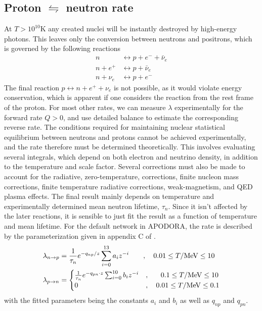\subsection[Proton to neutron rate]{Proton $\leftrightharpoons$ neutron rate}
At $T>10^{10}$K any created nuclei will be instantly destroyed by high-energy photons. This leaves only the conversion between neutrons and positrons, which is governed by the following reactions
\begin{align}
    n &\leftrightarrow p+e^-+\bar{\nu}_e\label{eq:np1}\\
    n+e^+ &\leftrightarrow p+\bar{\nu}_e\label{eq:np2}\\
    n+\nu_e &\leftrightarrow p+e^-
    \label{eq:np3}
\end{align}
The final reaction $p\leftrightarrow n+e^++\nu_e$ is not possible, as it would violate energy conservation, which is apparent if one considers the reaction from the rest frame of the proton. For most other rates, we can measure $\lambda$ experimentally for the forward rate $Q>0$, and use detailed balance to estimate the corresponding reverse rate. The conditions required for maintaining nuclear statistical equilibrium between neutrons and protons cannot be achieved experimentally, and the rate therefore must be determined theoretically. This involves evaluating several integrals, which depend on both electron and neutrino density, in addition to the temperature and scale factor. Several corrections must also be made to account for the radiative, zero-temperature, corrections, finite nucleon mass corrections, finite temperature radiative corrections, weak-magnetism, and QED plasma effects\cite{PRIMAT}. 
The final result mainly depends on temperature and experimentally determined mean neutron lifetime, $\tau_n$. Since it isn't affected by the later reactions, it is sensible to just fit the result as a function of temperature and mean lifetime. 
For the default network in APODORA, the rate is described by the parameterization given in appendix C of \textcite{Serpico_2004}.
\begin{align}
    \lambda_{n\rightarrow p}&=\frac{1}{\tau_n}e^{-q_{np}/z}\sum_{i=0}^{13}a_i z^{-i}\quad\quad , \quad 0.01\leq T/\text{MeV} \leq 10 \\
    \lambda_{p\rightarrow n}&=
\begin{cases}
    \frac{1}{\tau_n}e^{-q_{pn}\cdot z}\sum_{i=0}^{10}b_i z^{-i}&,\quad\ \ 0.1\leq T/\text{MeV} \leq 10\\
        0&,\quad 0.01\leq T/\text{MeV} \leq 0.1
\end{cases}
\end{align}
with the fitted parameters being the constants $a_i$ and $b_i$ as well as $q_{np}$ and $q_{pn}$. 


